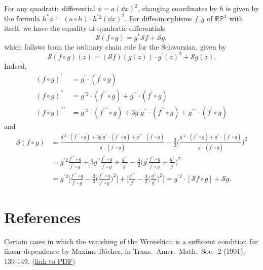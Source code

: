 \documentclass[11pt,leqno]{article}
\theoremstyle{plain}
\theoremstyle{definition}
\numberwithin{equation}{section}
\numberwithin{lem}{section}
\begin{document}
For any quadratic differential $\phi = a(\dd x)^2$, changing coordinates by $h$ is given by the formula $h^\ast\phi = (a\circ h)\cdot h^\prime{}^2(\dd x)^2$. For diffeomorphisms $f,g$ of $\mathbb{RP}^1$ with itself, we have the equality of quadratic differentials
\[\mathscr S(f\circ g) = g^\ast\mathscr Sf + \mathscr Sg,\]
which follows from the ordinary chain rule for the Schwarzian, given by
\[\mathscr S(f\circ g)(z) = (\mathscr Sf)(g(z))\cdot g^{\prime}(z)^2 + \mathscr Sg(z).\]
Indeed, 
\begin{align*}
    (f\circ g)^{\prime} &= g^\prime\cdot (f^\prime\circ g)\\
    (f\circ g)^{\prime\prime} &= g^\prime{}^2\cdot(f^{\prime\prime}\circ g) + g^{\prime\prime}\cdot (f^\prime\circ g)\\
    (f\circ g)^{\prime\prime\prime} &= g^\prime{}^3\cdot(f^{\prime\prime\prime}\circ g) + 3g^\prime g^{\prime\prime}\cdot (f^{\prime\prime}\circ g) + g^{\prime\prime\prime}\cdot(f^\prime\circ g)
\end{align*}
and 
\begin{align*}
    \mathscr S(f\circ g) &= \frac{g^\prime{}^3\cdot(f^{\prime\prime\prime}\circ g) + 3g^\prime g^{\prime\prime}\cdot (f^{\prime\prime}\circ g) + g^{\prime\prime\prime}\cdot(f^\prime\circ g)}{g^\prime\cdot (f^\prime\circ g)} - \frac{3}{2}\biggl(\frac{g^\prime{}^2\cdot(f^{\prime\prime}\circ g) + g^{\prime\prime}\cdot (f^\prime\circ g)}{g^\prime\cdot (f^\prime\circ g)}\biggr)^2\\
    &=g^\prime{}^2\frac{f^{\prime\prime\prime}\circ g}{f^\prime\circ g} + 3g^{\prime\prime}\frac{f^{\prime\prime}\circ g}{f^\prime\circ g} + \frac{g^{\prime\prime\prime}}{g^\prime} - \frac{3}{2}\biggl(g^\prime\frac{f^{\prime\prime}\circ g}{f^\prime \circ g} + \frac{g^{\prime\prime}}{g^\prime}\biggr)^2\\
    &= g^\prime{}^2\biggl[\frac{f^{\prime\prime\prime}\circ g}{f^\prime \circ g}-\frac{3}{2}\biggl(\frac{f^{\prime\prime}\circ g}{f^\prime\circ g}\biggr)^2\biggr] + \biggl[\frac{g^{\prime\prime\prime}}{g^\prime} - \frac{3}{2}\biggl(\frac{g^\prime\prime}{g^\prime}\biggr)^2\biggr] = g^{\prime}{}^2\cdot [\mathscr Sf\circ g] + \mathscr Sg.
\end{align*}

\newpage\section*{References}

Certain cases in which the vanishing of the Wronskian is a sufficient condition for linear dependence by Maxime B\^ocher, in Trans.~Amer.~Math.~Soc.~2 (1901), 139-149. (\href{https://www.ams.org/journals/tran/1901-002-02/S0002-9947-1901-1500560-5/S0002-9947-1901-1500560-5.pdf}{link to PDF})
\end{document}
